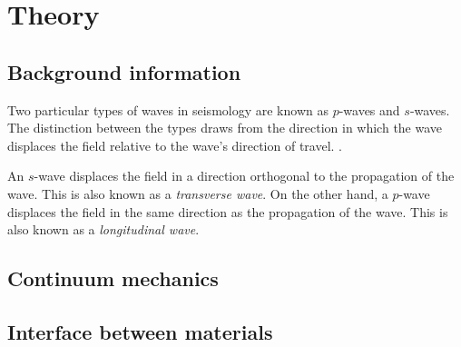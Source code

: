 \chapter{Theory}
\section{Background information}

Two particular types of waves in seismology are known as $p$-waves and $s$-waves. The distinction between the types draws from the direction in which the wave displaces the field relative to the wave's direction of travel. \cite[57]{stein2009introduction}.

An $s$-wave displaces the field in a direction orthogonal to the propagation of the wave. This is also known as a \textit{transverse wave}.
On the other hand, a $p$-wave displaces the field in the same direction as the propagation of the wave. This is also known as a \textit{longitudinal wave}\cite[57]{stein2009introduction}.





\section{Continuum mechanics}

\section{Interface between materials}
